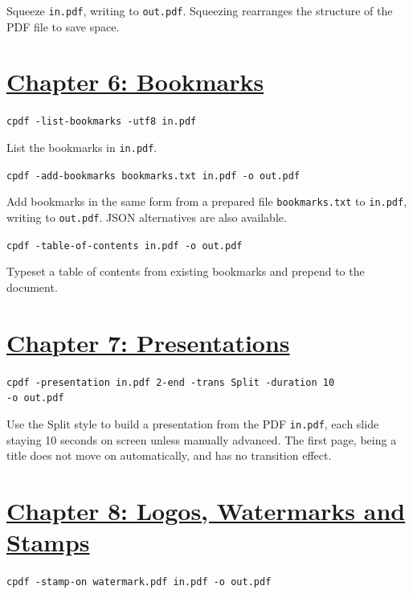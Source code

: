 \documentclass{book}
\begin{document}
\noindent Squeeze \texttt{in.pdf}, writing to \texttt{out.pdf}. Squeezing rearranges the structure of the PDF file to save space.


\section*{\hyperref[chap:6]{Chapter 6: Bookmarks}}

\begin{framed}\noindent\texttt{cpdf -list-bookmarks -utf8 in.pdf}\end{framed}

\noindent List the bookmarks in \texttt{in.pdf}. 

\begin{framed}\noindent\texttt{cpdf -add-bookmarks bookmarks.txt in.pdf -o out.pdf}\end{framed}

\noindent Add bookmarks in the same form from a prepared file \texttt{bookmarks.txt} to \texttt{in.pdf}, writing to \texttt{out.pdf}. JSON alternatives are also available.

\begin{framed}\noindent\texttt{cpdf -table-of-contents in.pdf -o out.pdf}\end{framed}

\noindent Typeset a table of contents from existing bookmarks and prepend to the document.

\section*{\hyperref[chap:7]{Chapter 7: Presentations}}

\begin{framed}\noindent\texttt{cpdf -presentation in.pdf 2-end -trans Split -duration 10\\\phantom{\ \ \ \ } -o out.pdf}\end{framed}

\noindent Use the Split style to build a presentation from the PDF \texttt{in.pdf}, each slide staying 10 seconds on screen unless manually advanced. The first page, being a title does not move on automatically, and has no transition effect.

\section*{\hyperref[chap:8]{Chapter 8: Logos, Watermarks and Stamps}}

\begin{framed}\noindent\texttt{cpdf -stamp-on watermark.pdf in.pdf -o out.pdf}\end{framed}
\end{document}
